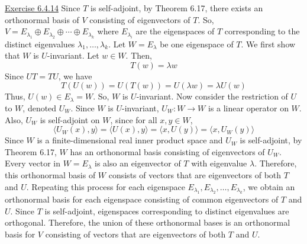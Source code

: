 \documentclass{exam}
\begin{document}
\underline{Exercise 6.4.14}
\newline
\newline
Since $T$ is self-adjoint, by Theorem 6.17, there exists an orthonormal basis of $V$ consisting of eigenvectors of $T$. So,$V=E_{\lambda_1}\oplus E_{\lambda_2}\oplus \cdots \oplus E_{\lambda_k}$ where $E_{\lambda_i}$ are the eigenspaces of $T$ corresponding to the distinct eigenvalues $\lambda_1,\dots,\lambda_k$. Let $W=E_\lambda$ be one eigenspace of $T$. We first show that $W$ is $U$-invariant. Let $w\in W$. Then,
\[T(w)=\lambda w\]
Since $UT=TU$, we have
\[T(U(w))=U(T(w))=U(\lambda w)=\lambda U(w)\]
Thus, $U(w)\in E_\lambda=W$. So, $W$ is $U$-invariant.
Now consider the restriction of $U$ to $W$, denoted $U_W$. Since $W$ is $U$-invariant, $U_W:W\to W$ is a linear operator on $W$. Also, $U_W$ is self-adjoint on $W$, since for all $x,y\in W$,
\[\langle U_W(x),y\rangle=\langle U(x),y\rangle=\langle x,U(y)\rangle=\langle x,U_W(y)\rangle\]
Since $W$ is a finite-dimensional real inner product space and $U_W$ is self-adjoint, by Theorem 6.17, $W$ has an orthonormal basis consisting of eigenvectors of $U_W$.
Every vector in $W=E_\lambda$ is also an eigenvector of $T$ with eigenvalue $\lambda$. Therefore, this orthonormal basis of $W$ consists of vectors that are eigenvectors of both $T$ and $U$.
Repeating this process for each eigenspace $E_{\lambda_1},E_{\lambda_2},\dots,E_{\lambda_k}$, we obtain an orthonormal basis for each eigenspace consisting of common eigenvectors of $T$ and $U$.
Since $T$ is self-adjoint, eigenspaces corresponding to distinct eigenvalues are orthogonal. Therefore, the union of these orthonormal bases is an orthonormal basis for $V$ consisting of vectors that are eigenvectors of both $T$ and $U$.
\newline
\end{document}
